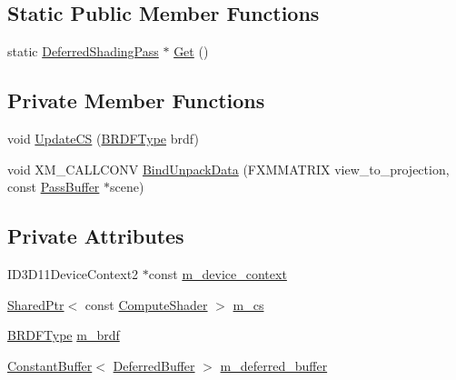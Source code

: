 \subsection*{Static Public Member Functions}
\begin{DoxyCompactItemize}
\item 
static \hyperlink{classmage_1_1_deferred_shading_pass}{Deferred\+Shading\+Pass} $\ast$ \hyperlink{classmage_1_1_deferred_shading_pass_a430dec186afda1f40c695b95fe3f7338}{Get} ()
\end{DoxyCompactItemize}
\subsection*{Private Member Functions}
\begin{DoxyCompactItemize}
\item 
void \hyperlink{classmage_1_1_deferred_shading_pass_aa79caf3b181591b6c25973dc8a1ff134}{Update\+CS} (\hyperlink{namespacemage_ae7a7a03a7b34d7e2689689bb8295cd38}{B\+R\+D\+F\+Type} brdf)
\item 
void X\+M\+\_\+\+C\+A\+L\+L\+C\+O\+NV \hyperlink{classmage_1_1_deferred_shading_pass_a58dfdd83a4ac7a8f95942ad5d9238ee1}{Bind\+Unpack\+Data} (F\+X\+M\+M\+A\+T\+R\+IX view\+\_\+to\+\_\+projection, const \hyperlink{structmage_1_1_pass_buffer}{Pass\+Buffer} $\ast$scene)
\end{DoxyCompactItemize}
\subsection*{Private Attributes}
\begin{DoxyCompactItemize}
\item 
I\+D3\+D11\+Device\+Context2 $\ast$const \hyperlink{classmage_1_1_deferred_shading_pass_aebba2ee59d127f2c186186c667c6016a}{m\+\_\+device\+\_\+context}
\item 
\hyperlink{namespacemage_a1e01ae66713838a7a67d30e44c67703e}{Shared\+Ptr}$<$ const \hyperlink{namespacemage_ae040329401484b076f0cd1a7c43d19c9}{Compute\+Shader} $>$ \hyperlink{classmage_1_1_deferred_shading_pass_a8d3bebdc41d116eb05d9f5a3c923f349}{m\+\_\+cs}
\item 
\hyperlink{namespacemage_ae7a7a03a7b34d7e2689689bb8295cd38}{B\+R\+D\+F\+Type} \hyperlink{classmage_1_1_deferred_shading_pass_a5a466f5c2ee71563f4f8ed6d042ee4b3}{m\+\_\+brdf}
\item 
\hyperlink{structmage_1_1_constant_buffer}{Constant\+Buffer}$<$ \hyperlink{structmage_1_1_deferred_buffer}{Deferred\+Buffer} $>$ \hyperlink{classmage_1_1_deferred_shading_pass_ae8ab3aa2d2ff93368c7774d982cb8bb7}{m\+\_\+deferred\+\_\+buffer}
\end{DoxyCompactItemize}


